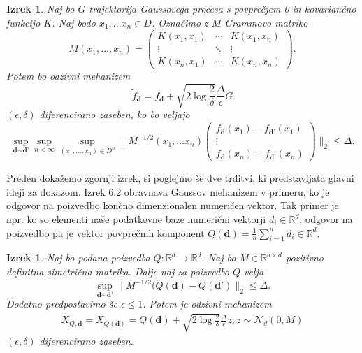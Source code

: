 \documentclass[12pt,a4paper]{amsart}
\theoremstyle{definition} %
\theoremstyle{plain} %
\newtheorem{izrek}[definicija]{Izrek}
\begin{document}
\begin{izrek}
Naj bo $G$ trajektorija Gaussovega procesa s povprečjem 0 in kovariančno funkcijo $K$. Naj bodo $x_1,...x_n \in D$. Označimo z $M$ Grammovo matriko
$$
M(x_1,...,x_n) = 
 \begin{pmatrix}
  K(x_1,x_1) & \cdots & K(x_1,x_n) \\
  \vdots    & \ddots & \vdots  \\
  K(x_n,x_1) & \cdots & K(x_n,x_n) 
 \end{pmatrix}
.$$
Potem bo odzivni mehanizem 
$$
\widetilde{f}_{\textbf{d}} = f_{\textbf{d}} + \sqrt{2\log{\frac{2}{\delta}}} \frac{\Delta}{\epsilon}G
$$
$(\epsilon, \delta)$ diferencirano zaseben, ko bo veljajo
\begin{equation}\label{meja}
\sup_{\textbf{d} \sim \textbf{d'}} \sup_{n < \infty} \sup_{(x_1,...,x_n) \in D^n} 
\|M^{-1/2}(x_1,...x_n)
\begin{pmatrix}
  f_{\textbf{d}}(x_1)-f_{\textbf{d'}}(x_1)  \\
  \vdots     \\
  f_{\textbf{d}}(x_n)-f_{\textbf{d'}}(x_n)
 \end{pmatrix}
\|_2 \leq \Delta. \tag{6}
\end{equation}
\end{izrek}
Preden dokažemo zgornji izrek, si poglejmo še dve trditvi, ki predstavljata glavni ideji za dokazom. Izrek 6.2 obravnava Gaussov mehanizem v primeru, ko je odgovor na poizvedbo končno dimenzionalen numeričen vektor. Tak primer je npr. ko so elementi naše podatkovne baze numerični vektorji $d_i \in \mathbb{R}^d$, odgovor na poizvedbo pa je vektor povprečnih komponent $Q(\textbf{d}) = \frac{1}{n} \sum_{i=1}^{n} d_i \in \mathbb{R}^d$.
\begin{izrek}
Naj bo podana poizvedba $Q: \mathbb{R}^d \rightarrow \mathbb{R}^d$. Naj bo $M \in \mathbb{R}^{d \times d}$ pozitivno definitna simetrična matrika. Dalje naj za poizvedbo $Q$ velja 
\begin{equation}\label{mejagauss}
\sup_{\textbf{d} \sim \textbf{d'}} \| M^{-1/2}(Q(\textbf{d})-Q(\textbf{d'})\|_{2} \leq \Delta. \tag{7}
\end{equation}
Dodatno predpostavimo še $\epsilon \leq 1$. Potem je odzivni mehanizem 
\begin{gather*}
X_{Q,\textbf{d}} = X_{Q(\textbf{d})} = Q(\textbf{d}) + \sqrt{2\log{\frac{2}{\delta}}} \frac{\Delta}{\epsilon} z, z \sim \mathcal{N}_d (0,M)
\end{gather*}
$(\epsilon, \delta)$ diferencirano zaseben.
\end{izrek}
\end{document}
